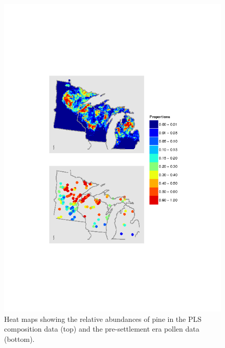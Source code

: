 \begin{figure}
\centering
\includegraphics[width=7in]{figures/maps_compare_PINE_mod.png}
\caption{Heat maps showing the relative abundances of pine in the PLS
  composition data (top) and the pre-settlement era pollen data
  (bottom).}
\label{fig:compare_maps_PINE}
\end{figure}

